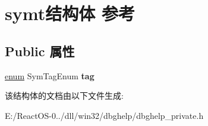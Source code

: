 \hypertarget{structsymt}{}\section{symt结构体 参考}
\label{structsymt}
\subsection*{Public 属性}
\begin{DoxyCompactItemize}
\item 
\mbox{\label{structsymt_a6e655b53cf13289525a181e903c8c5f2}} 
\hyperlink{interfaceenum}{enum} Sym\+Tag\+Enum {\bfseries tag}
\end{DoxyCompactItemize}


该结构体的文档由以下文件生成\+:\begin{DoxyCompactItemize}
\item 
E\+:/\+React\+O\+S-\/0../dll/win32/dbghelp/dbghelp\+\_\+private.\+h\end{DoxyCompactItemize}
